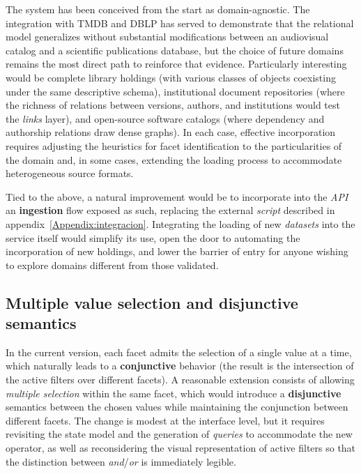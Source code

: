 The system has been conceived from the start as domain-agnostic. The integration with TMDB and
DBLP has served to demonstrate that the relational model generalizes without substantial
modifications between an audiovisual catalog and a scientific publications database, but the
choice of future domains remains the most direct path to reinforce that evidence. Particularly
interesting would be complete library holdings (with various classes of objects coexisting
under the same descriptive schema), institutional document repositories (where the richness of
relations between versions, authors, and institutions would test the \textit{links} layer), and
open-source software catalogs (where dependency and authorship relations draw dense graphs). In
each case, effective incorporation requires adjusting the heuristics for facet identification
to the particularities of the domain and, in some cases, extending the loading process to
accommodate heterogeneous source formats.

Tied to the above, a natural improvement would be to incorporate into the \textit{API} an
\textbf{ingestion} flow exposed as such, replacing the external \textit{script} described in
appendix~\ref{Appendix:integracion}. Integrating the loading of new \textit{datasets} into the
service itself would simplify its use, open the door to automating the incorporation of new
holdings, and lower the barrier of entry for anyone wishing to explore domains different from
those validated.

\subsection*{Multiple value selection and disjunctive semantics}

In the current version, each facet admits the selection of a single value at a time, which
naturally leads to a \textbf{conjunctive} behavior (the result is the intersection of the
active filters over different facets). A reasonable extension consists of allowing
\textit{multiple selection} within the same facet, which would introduce a \textbf{disjunctive}
semantics between the chosen values while maintaining the conjunction between different facets.
The change is modest at the interface level, but it requires revisiting the state model and the
generation of \textit{queries} to accommodate the new operator, as well as reconsidering the
visual representation of active filters so that the distinction between \textit{and}/\textit{or}
is immediately legible.

